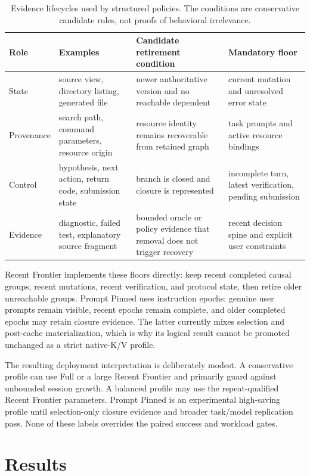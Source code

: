 \documentclass[11pt]{article}
\begin{document}
\begin{table}[H]
\centering
\small
\begin{tabularx}{\linewidth}{p{.16\linewidth}p{.30\linewidth}p{.25\linewidth}Y}
\toprule
Role & Examples & Candidate retirement condition & Mandatory floor \\
\midrule
State & source view, directory listing, generated file & newer authoritative version and no reachable dependent & current mutation and unresolved error state \\
Provenance & search path, command parameters, resource origin & resource identity remains recoverable from retained graph & task prompts and active resource bindings \\
Control & hypothesis, next action, return code, submission state & branch is closed and closure is represented & incomplete turn, latest verification, pending submission \\
Evidence & diagnostic, failed test, explanatory source fragment & bounded oracle or policy evidence that removal does not trigger recovery & recent decision spine and explicit user constraints \\
\bottomrule
\end{tabularx}
\caption{Evidence lifecycles used by structured policies.  The conditions are
conservative candidate rules, not proofs of behavioral irrelevance.}
\label{tab:evidence-lifecycle}
\end{table}

Recent Frontier implements these floors directly: keep recent completed causal
groups, recent mutations, recent verification, and protocol state, then retire
older unreachable groups.  Prompt Pinned uses instruction epochs: genuine user
prompts remain visible, recent epochs remain complete, and older completed
epochs may retain closure evidence.  The latter currently mixes selection and
post-cache materialization, which is why its logical result cannot be promoted
unchanged as a strict native-K/V profile.

The resulting deployment interpretation is deliberately modest.  A
conservative profile can use Full or a large Recent Frontier and primarily
guard against unbounded session growth.  A balanced profile may use the
repeat-qualified Recent Frontier parameters.  Prompt Pinned is an experimental
high-saving profile until selection-only closure evidence and broader
task/model replication pass.  None of these labels overrides the paired
success and workload gates.

\section{Results}
\end{document}
